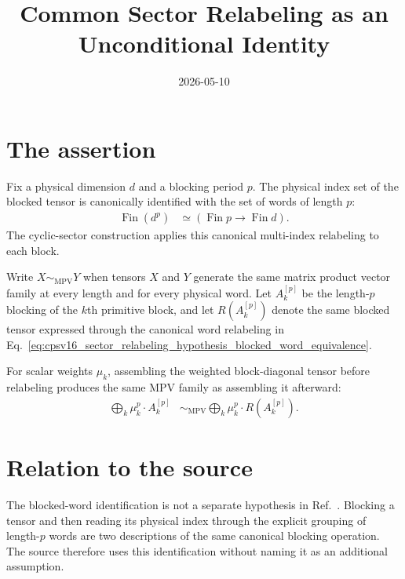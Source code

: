 \documentclass{article}
\title{Common Sector Relabeling as an Unconditional Identity}
\author{}
\date{2026-05-10}
\begin{document}
\maketitle
{}

\section{The assertion}

Fix a physical dimension $d$ and a blocking period $p$. The physical index set
of the blocked tensor is canonically identified with the set of words of length
$p$:
\begin{align}
    \operatorname{Fin}(d^p)
        &\simeq
        (\operatorname{Fin}p\to\operatorname{Fin}d).
    \label{eq:cpsv16_sector_relabeling_hypothesis_blocked_word_equivalence}
\end{align}
The cyclic-sector construction applies this canonical multi-index relabeling
to each block.

Write $X\sim_{\mathrm{MPV}}Y$ when tensors $X$ and $Y$ generate the same
matrix product vector family at every length and for every physical word. Let
$A_k^{[p]}$ be the length-$p$ blocking of the $k$th primitive block, and let
$R(A_k^{[p]})$ denote the same blocked tensor expressed through the canonical
word relabeling in
Eq.~\ref{eq:cpsv16_sector_relabeling_hypothesis_blocked_word_equivalence}.

For scalar weights $\mu_k$, assembling the weighted block-diagonal tensor
before relabeling produces the same MPV family as assembling it afterward:
\begin{align}
    \bigoplus_k \mu_k^p\cdot A_k^{[p]}
        &\sim_{\mathrm{MPV}}
        \bigoplus_k \mu_k^p\cdot R(A_k^{[p]}).
    \label{eq:cpsv16_sector_relabeling_hypothesis_common_relabeling_identity}
\end{align}

\section{Relation to the source}

The blocked-word identification is not a separate hypothesis in
Ref.~\cite{Cirac2016MPDO_arXiv}. Blocking a tensor and then reading its physical
index through the explicit grouping of length-$p$ words are two descriptions
of the same canonical blocking operation. The source therefore uses this
identification without naming it as an additional assumption.
\end{document}

